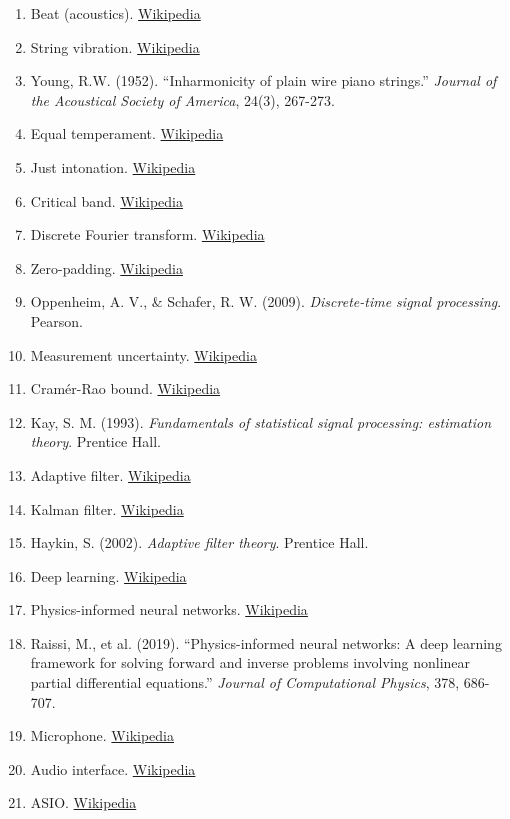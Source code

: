 \documentclass[11pt,a4paper]{article}
\begin{document}
\begin{enumerate}
    \item Beat (acoustics). \href{https://en.wikipedia.org/wiki/Beat_(acoustics)}{Wikipedia}
    \item String vibration. \href{https://en.wikipedia.org/wiki/Vibrating_string}{Wikipedia}
    \item Young, R.W. (1952). ``Inharmonicity of plain wire piano strings.'' \textit{Journal of the Acoustical Society of America}, 24(3), 267-273.
    \item Equal temperament. \href{https://en.wikipedia.org/wiki/Equal_temperament}{Wikipedia}
    \item Just intonation. \href{https://en.wikipedia.org/wiki/Just_intonation}{Wikipedia}
    \item Critical band. \href{https://en.wikipedia.org/wiki/Critical_band}{Wikipedia}
    \item Discrete Fourier transform. \href{https://en.wikipedia.org/wiki/Discrete_Fourier_transform}{Wikipedia}
    \item Zero-padding. \href{https://en.wikipedia.org/wiki/Zero-padding}{Wikipedia}
    \item Oppenheim, A. V., \& Schafer, R. W. (2009). \textit{Discrete-time signal processing}. Pearson.
    \item Measurement uncertainty. \href{https://en.wikipedia.org/wiki/Measurement_uncertainty}{Wikipedia}
    \item Cramér-Rao bound. \href{https://en.wikipedia.org/wiki/Cram\%C3\%A9r\%E2\%80\%93Rao_bound}{Wikipedia}
    \item Kay, S. M. (1993). \textit{Fundamentals of statistical signal processing: estimation theory}. Prentice Hall.
    \item Adaptive filter. \href{https://en.wikipedia.org/wiki/Adaptive_filter}{Wikipedia}
    \item Kalman filter. \href{https://en.wikipedia.org/wiki/Kalman_filter}{Wikipedia}
    \item Haykin, S. (2002). \textit{Adaptive filter theory}. Prentice Hall.
    \item Deep learning. \href{https://en.wikipedia.org/wiki/Deep_learning}{Wikipedia}
    \item Physics-informed neural networks. \href{https://en.wikipedia.org/wiki/Physics-informed_neural_network}{Wikipedia}
    \item Raissi, M., et al. (2019). ``Physics-informed neural networks: A deep learning framework for solving forward and inverse problems involving nonlinear partial differential equations.'' \textit{Journal of Computational Physics}, 378, 686-707.
    \item Microphone. \href{https://en.wikipedia.org/wiki/Microphone}{Wikipedia}
    \item Audio interface. \href{https://en.wikipedia.org/wiki/Audio_interface}{Wikipedia}
    \item ASIO. \href{https://en.wikipedia.org/wiki/Audio_Stream_Input/Output}{Wikipedia}
\end{enumerate}
\end{document}
